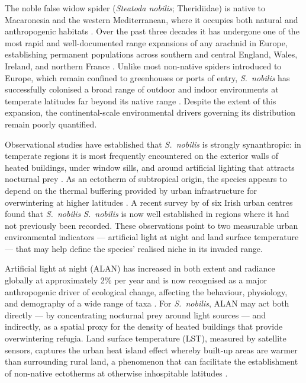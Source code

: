 \documentclass[11pt, a4paper, twocolumn]{article}
\begin{document}
The noble false widow spider (\textit{Steatoda nobilis}; Theridiidae) is native to Macaronesia and the western Mediterranean, 
where it occupies both natural and anthropogenic habitats \citep{Bauer2019}. Over the past three decades it has undergone one
of the most rapid and well-documented range expansions of any arachnid in Europe, establishing permanent populations across
southern and central England, Wales, Ireland, and northern France \citep{Bauer2019, Dugon2017}. Unlike most non-native spiders
introduced to Europe, which remain confined to greenhouses or ports of entry, \textit{S.~nobilis} has successfully colonised a
broad range of outdoor and indoor environments at temperate latitudes far beyond its native range \citep{Nentwig2015}. Despite the extent of this expansion, the continental-scale environmental drivers governing its distribution remain poorly quantified.

Observational studies have established that \textit{S.~nobilis} is strongly synanthropic: in temperate regions it is most 
frequently encountered on the exterior walls of heated buildings, under window sills, and around artificial lighting that 
attracts nocturnal prey \citep{Dugon2017, Bauer2019}. 
As an ectotherm of subtropical origin, the species appears to depend on the thermal buffering provided by urban infrastructure 
for overwintering at higher latitudes \citet{Bauer2019}. A recent survey by \citet{Collier2026} of six Irish urban centres found that \textit{S.~nobilis} 
\textit{S.~nobilis} is now well established in regions where it had not previously been recorded. 
These observations point to two measurable urban environmental indicators 
--- artificial light at night and land surface temperature --- that may help define the species' realised niche in its invaded 
range.

Artificial light at night (ALAN) has increased in both extent and radiance globally at approximately 2\% per year \citep{Kyba2017} and is now recognised as a major anthropogenic driver of ecological change, affecting the behaviour, physiology, and demography of a wide range of taxa \citep{Gaston2015, GastonBennie2014, Holker2010}. For \textit{S.~nobilis}, ALAN may act both directly --- by concentrating nocturnal prey around light sources --- and indirectly, as a spatial proxy for the density of heated buildings that provide overwintering refugia. Land surface temperature (LST), measured by satellite sensors, captures the urban heat island effect whereby built-up areas are warmer than surrounding rural land, a phenomenon that can facilitate the establishment of non-native ectotherms at otherwise inhospitable latitudes \citep{Meineke2013}.
\end{document}
